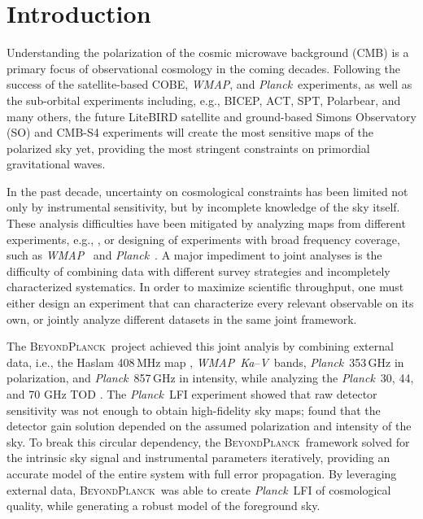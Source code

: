 \documentclass[twocolumn]{../../common/aa}
\def\WMAP{\emph{WMAP}}
\def\Planck{\emph{Planck}}
\newcommand{\bp}{\textsc{BeyondPlanck}}
\newcommand{\Ka}[0]{\textit{Ka}}
\newcommand{\V}[0]{\textit V}
\begin{document}
\maketitle

\tableofcontents




\section{Introduction}
\label{sec:introduction}

Understanding the polarization of the cosmic microwave background (CMB) is a primary focus of observational cosmology in the coming decades. Following the success of the satellite-based COBE, \WMAP, and \Planck\ experiments, as well as the sub-orbital experiments including, e.g., BICEP, ACT, SPT, Polarbear, and many others, the future LiteBIRD satellite and ground-based Simons Observatory (SO) and CMB-S4 experiments will create the most sensitive maps of the polarized sky yet, providing the most stringent constraints on primordial gravitational waves.

In the past decade, uncertainty on cosmological constraints has been limited not only by instrumental sensitivity, but by incomplete knowledge of the sky itself. These analysis difficulties have been mitigated by analyzing maps from different experiments, e.g., \citet{pb2015}, or designing of experiments with broad frequency coverage, such as \WMAP\ \citep{bennett2012} and \Planck\ \citet{planck2016-l01}. A major impediment to joint analyses is the difficulty of combining data with different survey strategies and incompletely characterized systematics. In order to maximize scientific throughput, one must either design an experiment that can characterize every relevant observable on its own, or jointly analyze different datasets in the same joint framework.

The \bp\ project achieved this joint analyis by combining external data, i.e., the Haslam 408\,MHz map \citep{haslam1982}, \WMAP\ \Ka--\V\ bands, \Planck\ 353\,GHz in polarization, and \Planck\ 857\,GHz in intensity, while analyzing the \Planck\ 30, 44, and 70 GHz TOD \citep{bp01}.
The \Planck\ LFI experiment showed that raw detector sensitivity was not enough to obtain high-fidelity sky maps; \citet{planck2016-l02} found that the detector gain solution depended on the assumed polarization and intensity of the sky. To break this circular dependency, the \bp\ framework solved for the intrinsic sky signal and instrumental parameters iteratively, providing an accurate model of the entire system with full error propagation. By leveraging external data, \bp\ was able to create \Planck\ LFI of cosmological quality, while generating a robust model of the foreground sky.
\end{document}

